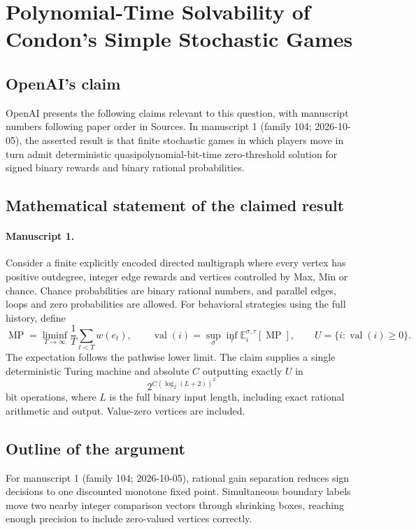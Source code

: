 \documentclass[11pt]{article}
\begin{document}
\section*{Polynomial-Time Solvability of Condon's Simple Stochastic Games}

\subsection{OpenAI's claim}
OpenAI presents the following claims relevant to this question, with manuscript numbers following paper order in Sources. In manuscript 1 (family 104; 2026-10-05), the asserted result is that finite stochastic games in which players move in turn admit deterministic quasipolynomial-bit-time zero-threshold solution for signed binary rewards and binary rational probabilities.

\subsection{Mathematical statement of the claimed result}
\paragraph{Manuscript 1.}
Consider a finite explicitly encoded directed multigraph where every vertex has positive outdegree, integer edge rewards and vertices controlled by Max, Min or chance. Chance probabilities are binary rational numbers, and parallel edges, loops and zero probabilities are allowed. For behavioral strategies using the full history, define
\[
 \operatorname{MP}=\liminf_{T\to\infty}\frac1T\sum_{t<T}w(e_t),\qquad
 \operatorname{val}(i)=\sup_{\sigma}\inf_{\tau}\mathbb E_i^{\sigma,\tau}[\operatorname{MP}],
 \qquad U=\{i:\operatorname{val}(i)\ge0\}.
\]
The expectation follows the pathwise lower limit. The claim supplies a single deterministic Turing machine and absolute $C$ outputting exactly $U$ in
\[
 2^{C(\log_2(L+2))^2}
\]
bit operations, where $L$ is the full binary input length, including exact rational arithmetic and output. Value-zero vertices are included.

\subsection{Outline of the argument}
For manuscript 1 (family 104; 2026-10-05), rational gain separation reduces sign decisions to one discounted monotone fixed point. Simultaneous boundary labels move two nearby integer comparison vectors through shrinking boxes, reaching enough precision to include zero-valued vertices correctly.
\end{document}
